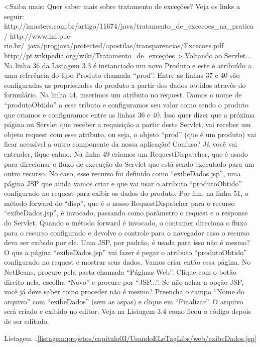 <Saiba mais:
Quer saber mais sobre tratamento de exceções? Veja os links a seguir:
http://imasters.com.br/artigo/11674/java/tratamento\_de\_excecoes\_na\_pratica/
http://www.inf.puc-rio.br/~java/progjava/protected/apostilas/transparencias/Excecoes.pdf
http://pt.wikipedia.org/wiki/Tratamento\_de\_exceções
>
Voltando ao Servlet... Na linha 36 da Listagem 3.3 é instanciado um novo Produto e este é atribuído a uma referência do tipo Produto chamada ``prod''. Entre as linhas 37 e 40 são configuradas as propriedades do produto a partir dos dados obtidos através do formulário. Na linha 44, inserimos um atributo no request. Damos o nome de ``produtoObtido'' a esse tributo e configuramos  seu valor como sendo o produto que criamos e configuramos entre as linhas 36 e 40. Isso quer dizer que a próxima página ou Servlet que receber a requisição a partir deste Servlet, vai receber um objeto request com esse atributo, ou seja, o objeto ``prod'' (que é um produto) vai ficar acessível a outro componente da nossa aplicação! Confuso? Já você vai entender, fique calmo.
Na linha 49 criamos um RequestDispatcher, que é usado para direcionar o fluxo de execução do Servlet que está sendo executado para um outro recurso. No caso, esse recurso foi definido como ``exibeDados.jsp'', uma página JSP que ainda vamos criar e que vai usar o atributo ``produtoObtido'' configurado no request para exibir os dados do produto.
Por fim, na linha 51, o método forward de ``disp'', que é o nosso RequestDispatcher para o recurso ``exibeDados.jsp'', é invocado, passando como parâmetro o request e o response do Servlet. Quando o método forward é invocado, o container direciona o fluxo para o recurso configurado e devolve o controle para o navegador caso o recurso deva ser exibido por ele. Uma JSP, por padrão, é usada para isso não é mesmo?
O que a página ``exibeDados.jsp'' vai fazer é pegar o atributo ``produtoObtido'' configurado no request e mostrar seus dados. Vamos criar então essa página. No NetBeans, procure pela pasta chamada ``Páginas Web''. Clique com o botão direito nela, escolha ``Novo'' e procure por ``JSP...''. Se não achar a opção JSP, você já deve saber como proceder não é mesmo? Preencha o campo ``Nome do arquivo'' com ``exibeDados'' (sem as aspas) e clique em ``Finalizar''. O arquivo será criado e exibido no editor. Veja na Listagem 3.4 como ficou o código depois de ser editado.



Listagem~\thechapter.\ref{listagem:projetos/capitulo03/UsandoELeTagLibs/web/exibeDados.jsp}


